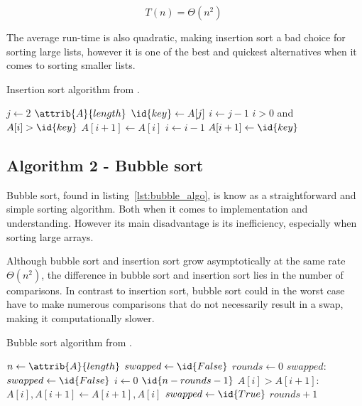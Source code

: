\documentclass[sigconf, nonacm, natbib, screen, balance=False]{acmart}
\begin{document}
\begin{equation}
  T(n) = \Theta(n^2) \;  \label{eq:ins_sort_worst}
\end{equation}

The average run-time is also quadratic, making insertion sort a bad choice for sorting large lists, however it is one of the best and quickest alternatives when it comes to sorting smaller lists. 

\begin{listing}
  \caption{Insertion sort algorithm from \citet[Ch.~2.1]{CLRS}.}
  \label{lst:insertion_algo}

  \begin{codebox}
    \li \For $j \gets 2$ \To $\attrib{A}{length}$
    \li \Do
    $\id{key} \gets A[j]$
    \li     $i \gets j-1$
    \li      \While $i>0$ and $A[i] > \id{key}$
    \li      \Do
    $A[i+1] \gets A[i]$
    \li         $i \gets i-1$
    \End    
    \li       $A[i+1]\gets \id{key}$
    \End
  \end{codebox}
\end{listing}

\subsection{Algorithm 2 - Bubble sort}\label{sec:algo2}

Bubble sort, found in listing~\ref{lst:bubble_algo}, is know as a straightforward and simple sorting algorithm. Both when it comes to implementation and understanding. However its main disadvantage is its inefficiency, especially when sorting large arrays.

Although bubble sort and insertion sort grow asymptotically at the same rate $\Theta(n^2)$, the difference in bubble sort and insertion sort lies in the number of comparisons. In contrast to insertion sort, bubble sort could in the worst case have to make numerous comparisons that do not necessarily result in a swap, making it computationally slower. 

\begin{listing}
  \caption{Bubble sort algorithm from \citet[Ch.~2.1]{CLRS_2009}.}
  \label{lst:bubble_algo}

  \begin{codebox}
    \li $n \gets \attrib{A}{length}$
    \li $swapped \gets \id{False}$
    \li $rounds \gets 0$
    \li \While $swapped:$
    \li \Do
    $swapped \gets \id{False}$
    \li \For $i \gets 0 $ \To $\id{n - rounds - 1}$
    \li     \Do
    \If $A[i] > A[i+1]:$
    \li     \Do
    $A[i], A[i+1] \gets A[i+1], A[i]$
    \li $swapped \gets \id{True}$
    \End
    \End    
    \li $rounds + 1$
    \End
  \end{codebox}
\end{listing}
\end{document}
